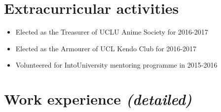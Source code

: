 \documentclass{article}
\begin{document}
\begin{multicols}{2}
\section*{\normalfont Extracurricular activities}

\begin{itemize}
    \item Elected as the Treasurer of UCLU Anime Society for 2016-2017
    \item Elected as the Armourer of UCL Kendo Club for 2016-2017
    \item Volunteered for IntoUniversity mentoring programme in 2015-2016
\end{itemize}

\vfill


\pagebreak

\section*{\normalfont Work experience \emph{\small\color{gray}(detailed)}}


\end{multicols}
\end{document}
